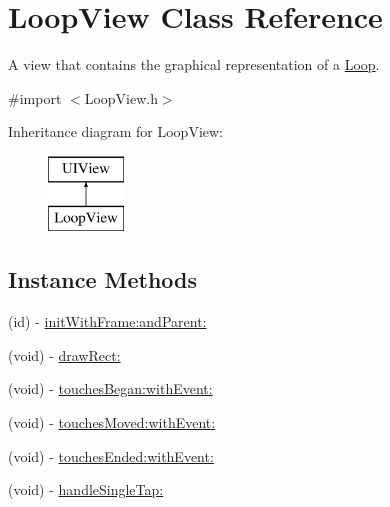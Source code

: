 \hypertarget{interface_loop_view}{\section{Loop\-View Class Reference}
\label{interface_loop_view}
}


A view that contains the graphical representation of a \hyperlink{interface_loop}{Loop}.  




{\ttfamily \#import $<$Loop\-View.\-h$>$}

Inheritance diagram for Loop\-View\-:\begin{figure}[H]
\begin{center}
\leavevmode
\includegraphics[height=2.000000cm]{interface_loop_view}
\end{center}
\end{figure}
\subsection*{Instance Methods}
\begin{DoxyCompactItemize}
\item 
(id) -\/ \hyperlink{interface_loop_view_a1e7227b1d41e651a603e80315935a3ee}{init\-With\-Frame\-:and\-Parent\-:}
\item 
(void) -\/ \hyperlink{interface_loop_view_a8c03538769a6fcbd7aa8e672cf4b5c96}{draw\-Rect\-:}
\item 
(void) -\/ \hyperlink{interface_loop_view_a2357112d7fefe9f720ac82c881236830}{touches\-Began\-:with\-Event\-:}
\item 
(void) -\/ \hyperlink{interface_loop_view_a06bf1152e9fa0dd16bf7f46128ae0cff}{touches\-Moved\-:with\-Event\-:}
\item 
(void) -\/ \hyperlink{interface_loop_view_ad9cc995e0aa0c5e28ab827a06c897c36}{touches\-Ended\-:with\-Event\-:}
\item 
(void) -\/ \hyperlink{interface_loop_view_a38393b10eebe5376725616eb446df377}{handle\-Single\-Tap\-:}
\end{DoxyCompactItemize}
